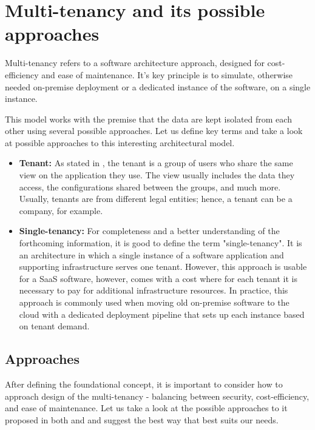 \section{Multi-tenancy and its possible approaches}
\label{sec:different-approaches-for-multitanency}
Multi-tenancy refers to a software architecture approach, designed for cost-efficiency and ease of maintenance.
It's key principle is to simulate, otherwise needed on-premise deployment or a dedicated instance of the software, on a single instance.

This model works with the premise that the data are kept isolated from each other using several possible approaches.
Let us define key terms and take a look at possible approaches to this interesting architectural model.

\begin{itemize}
    \item \textbf{Tenant:} As stated in \cite{MultitennancyArchitecture2012}, the tenant is a group of users who share the same view on the application they use.
    The view usually includes the data they access, the configurations shared between the groups, and much more.
    Usually, tenants are from different legal entities; hence, a tenant can be a company, for example.
    \item \textbf{Single-tenancy:} For completeness and a better understanding of the forthcoming information, it is good to define the term "single-tenancy".
    It is an architecture in which a single instance of a software application and supporting infrastructure serves one tenant.
    However, this approach is usable for a \ac{SaaS} software, however, comes with a cost where for each tenant it is necessary to pay for additional infrastructure resources.
    In practice, this approach is commonly used when moving old on-premise software to the cloud with a dedicated deployment pipeline that sets up each instance based on tenant demand. 
\end{itemize}


\subsection{Approaches}
After defining the foundational concept, it is important to consider how to approach design of the multi-tenancy - balancing between security, cost-efficiency, and ease of maintenance.
Let us take a look at the possible approaches to it proposed in both \cite{MultitennancyArchitecture2012} and \cite{MultitenancyArchitectureMedium} and suggest the best way that best suits our needs.

